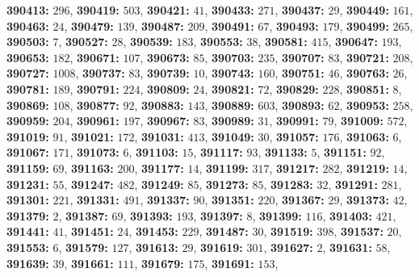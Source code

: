 \textsf{\bfseries 390413:} $296$, \textsf{\bfseries 390419:} $503$, \textsf{\bfseries 390421:} $41$, \textsf{\bfseries 390433:} $271$, \textsf{\bfseries 390437:} $29$, \textsf{\bfseries 390449:} $161$, \textsf{\bfseries 390463:} $24$, \textsf{\bfseries 390479:} $139$, \textsf{\bfseries 390487:} $209$, \textsf{\bfseries 390491:} $67$, \textsf{\bfseries 390493:} $179$, \textsf{\bfseries 390499:} $265$, \textsf{\bfseries 390503:} $7$, \textsf{\bfseries 390527:} $28$, \textsf{\bfseries 390539:} $183$, \textsf{\bfseries 390553:} $38$, \textsf{\bfseries 390581:} $415$, \textsf{\bfseries 390647:} $193$, \textsf{\bfseries 390653:} $182$, \textsf{\bfseries 390671:} $107$, \textsf{\bfseries 390673:} $85$, \textsf{\bfseries 390703:} $235$, \textsf{\bfseries 390707:} $83$, \textsf{\bfseries 390721:} $208$, \textsf{\bfseries 390727:} $1008$, \textsf{\bfseries 390737:} $83$, \textsf{\bfseries 390739:} $10$, \textsf{\bfseries 390743:} $160$, \textsf{\bfseries 390751:} $46$, \textsf{\bfseries 390763:} $26$, \textsf{\bfseries 390781:} $189$, \textsf{\bfseries 390791:} $224$, \textsf{\bfseries 390809:} $24$, \textsf{\bfseries 390821:} $72$, \textsf{\bfseries 390829:} $228$, \textsf{\bfseries 390851:} $8$, \textsf{\bfseries 390869:} $108$, \textsf{\bfseries 390877:} $92$, \textsf{\bfseries 390883:} $143$, \textsf{\bfseries 390889:} $603$, \textsf{\bfseries 390893:} $62$, \textsf{\bfseries 390953:} $258$, \textsf{\bfseries 390959:} $204$, \textsf{\bfseries 390961:} $197$, \textsf{\bfseries 390967:} $83$, \textsf{\bfseries 390989:} $31$, \textsf{\bfseries 390991:} $79$, \textsf{\bfseries 391009:} $572$, \textsf{\bfseries 391019:} $91$, \textsf{\bfseries 391021:} $172$, \textsf{\bfseries 391031:} $413$, \textsf{\bfseries 391049:} $30$, \textsf{\bfseries 391057:} $176$, \textsf{\bfseries 391063:} $6$, \textsf{\bfseries 391067:} $171$, \textsf{\bfseries 391073:} $6$, \textsf{\bfseries 391103:} $15$, \textsf{\bfseries 391117:} $93$, \textsf{\bfseries 391133:} $5$, \textsf{\bfseries 391151:} $92$, \textsf{\bfseries 391159:} $69$, \textsf{\bfseries 391163:} $200$, \textsf{\bfseries 391177:} $14$, \textsf{\bfseries 391199:} $317$, \textsf{\bfseries 391217:} $282$, \textsf{\bfseries 391219:} $14$, \textsf{\bfseries 391231:} $55$, \textsf{\bfseries 391247:} $482$, \textsf{\bfseries 391249:} $85$, \textsf{\bfseries 391273:} $85$, \textsf{\bfseries 391283:} $32$, \textsf{\bfseries 391291:} $281$, \textsf{\bfseries 391301:} $221$, \textsf{\bfseries 391331:} $491$, \textsf{\bfseries 391337:} $90$, \textsf{\bfseries 391351:} $220$, \textsf{\bfseries 391367:} $29$, \textsf{\bfseries 391373:} $42$, \textsf{\bfseries 391379:} $2$, \textsf{\bfseries 391387:} $69$, \textsf{\bfseries 391393:} $193$, \textsf{\bfseries 391397:} $8$, \textsf{\bfseries 391399:} $116$, \textsf{\bfseries 391403:} $421$, \textsf{\bfseries 391441:} $41$, \textsf{\bfseries 391451:} $24$, \textsf{\bfseries 391453:} $229$, \textsf{\bfseries 391487:} $30$, \textsf{\bfseries 391519:} $398$, \textsf{\bfseries 391537:} $20$, \textsf{\bfseries 391553:} $6$, \textsf{\bfseries 391579:} $127$, \textsf{\bfseries 391613:} $29$, \textsf{\bfseries 391619:} $301$, \textsf{\bfseries 391627:} $2$, \textsf{\bfseries 391631:} $58$, \textsf{\bfseries 391639:} $39$, \textsf{\bfseries 391661:} $111$, \textsf{\bfseries 391679:} $175$, \textsf{\bfseries 391691:} $153$, 
